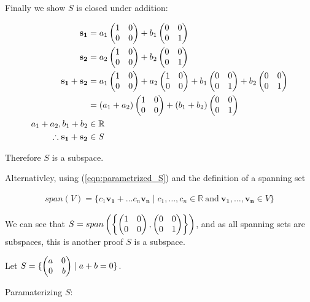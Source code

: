 \documentclass[12pt]{article}
\newenvironment{abc}{\begin{enumerate}[label={\bf(\alph*)}]}{\end{enumerate}}
\newcommand\m[2][]{
	\ifthenelse{\equal {#1} {}}
		{\begin{pmatrix*}[r]#2\end{pmatrix*}}
		{\left(\begin{array}{#1}#2\end{array}\right)}
}
\newcommand\resetequation[1][1]{\setcounter{equation}{#1 - 1}}
\renewcommand{\vec}[1]{\mathbf{#1}}
\begin{document}
\begin{abc}
\begin{item}
	Finally we show $S$ is closed under addition:

	\begin{equation}
	\begin{aligned}
		\vec{s_1} &= a_1 \m{1 & 0 \\ 0 & 0} + b_1 \m{0 & 0 \\ 0 & 1} \\
		\vec{s_2} &= a_2 \m{1 & 0 \\ 0 & 0} + b_2 \m{0 & 0 \\ 0 & 1} \\
		\vec {s_1} + \vec{s_2} &= a_1 \m{1 & 0 \\ 0 & 0} + a_2 \m{1 & 0 \\ 0 & 0} + b_1 \m{0 & 0 \\ 0 & 1} + b_2 \m{0 & 0 \\ 0 & 1} \\
		                       &= (a_1 + a_2) \m{1 & 0 \\ 0 & 0} + (b_1 + b_2) \m{0 & 0 \\ 0 & 1} \\
		a_1 + a_2, b_1 + b_2 &\in \mathbb{R} \\
		\therefore \vec{s_1} + \vec{s_2} &\in S
	\end{aligned}
	\end{equation}

	Therefore $S$ is a subspace.

	Alternativley, using (\ref{eqn:parametrized_S}) and the definition of a spanning set

	\begin{equation}
	\begin{aligned}
		span(V) = \{ c_1 \vec{v_1} + \ldots c_n \vec{v_n} \mid c_1, \ldots, c_n \in \mathbb{R} \: \text{and} \: \vec{v_1}, \ldots, \vec{v_n} \in V \}
	\end{aligned}
	\end{equation}

	We can see that $S = span\left( \left\{ \m{1 & 0 \\ 0 & 0}, \m{0 & 0 \\ 0 & 1} \right\} \right)$,
	and as all spanning sets are subspaces, this is another proof $S$ is a subspace.
\end{item}

\begin{item}
	\resetequation
	Let $S = \{ \m{a & 0 \\ 0 & b} \mid a + b = 0 \}$.

	Paramaterizing $S$:
	

\end{item}
\end{abc}
\end{document}
